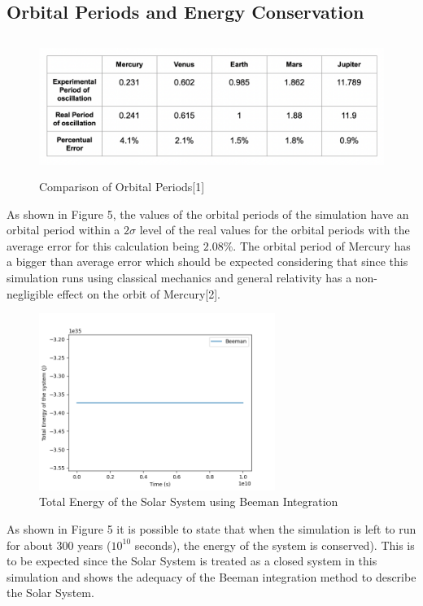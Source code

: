\documentclass{article}
\begin{document}
\subsection{Orbital Periods and Energy Conservation}

\begin{figure}[H]
    \centering
    \includegraphics[width=13.0608cm, height=4.4496cm]{Errors.png}
    \caption{Comparison of Orbital Periods[1]}
    \label{fig:my_label}
\end{figure}

{As shown in Figure 5, the values of the orbital periods of the simulation have an orbital period within a $2\sigma$ level of the real values for the orbital periods with the average error for this calculation being $2.08\%$. The orbital period of Mercury has a bigger than average error which should be expected considering that since this simulation runs using classical mechanics and general relativity has a non-negligible effect on the orbit of Mercury[2].}

\begin{figure}[H]
    \centering
    \includegraphics[width=7.68cm, height=5.76cm]{Beeman Eneergy conservation.png}
    \caption{Total Energy of the Solar System using Beeman Integration}
    \label{fig:my_label}
\end{figure}

{As shown in Figure 5 it is possible to state that when the simulation is left to run for about 300 years ($10^{10}$ seconds), the energy of the system is conserved). This is to be expected since the Solar System is treated as a closed system in this simulation and shows the adequacy of the Beeman integration method to describe the Solar System.}
\end{document}

